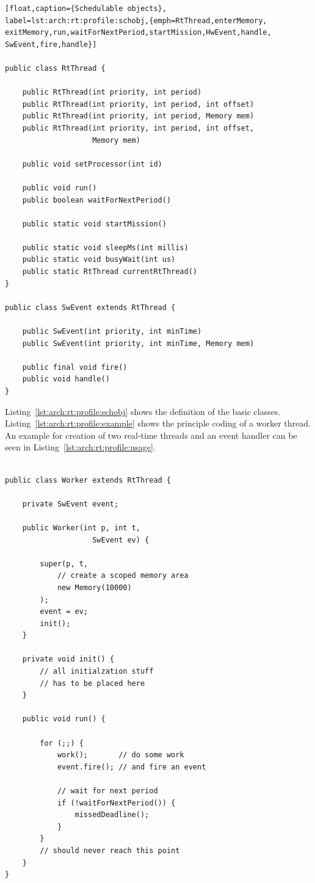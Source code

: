 \begin{lstlisting}[float,caption={Schedulable objects},
label=lst:arch:rt:profile:schobj,{emph=RtThread,enterMemory,
exitMemory,run,waitForNextPeriod,startMission,HwEvent,handle,
SwEvent,fire,handle}]

public class RtThread {

    public RtThread(int priority, int period)
    public RtThread(int priority, int period, int offset)
    public RtThread(int priority, int period, Memory mem)
    public RtThread(int priority, int period, int offset,
                    Memory mem)

    public void setProcessor(int id)

    public void run()
    public boolean waitForNextPeriod()

    public static void startMission()

    public static void sleepMs(int millis)
    public static void busyWait(int us)
    public static RtThread currentRtThread()
}

public class SwEvent extends RtThread {

    public SwEvent(int priority, int minTime)
    public SwEvent(int priority, int minTime, Memory mem)

    public final void fire()
    public void handle()
}
\end{lstlisting}

Listing~\ref{lst:arch:rt:profile:schobj} shows the definition of the
basic classes. Listing~\ref{lst:arch:rt:profile:example} shows the
principle coding of a worker thread. An example for creation of two
real-time threads and an event handler can be seen in
Listing~\ref{lst:arch:rt:profile:usage}.

\begin{lstlisting}[float,caption={A periodic real-time thread},
label=lst:arch:rt:profile:example]

public class Worker extends RtThread {

    private SwEvent event;

    public Worker(int p, int t,
                    SwEvent ev) {

        super(p, t,
            // create a scoped memory area
            new Memory(10000)
        );
        event = ev;
        init();
    }

    private void init() {
        // all initialzation stuff
        // has to be placed here
    }

    public void run() {

        for (;;) {
            work();       // do some work
            event.fire(); // and fire an event

            // wait for next period
            if (!waitForNextPeriod()) {
                missedDeadline();
            }
        }
        // should never reach this point
    }
}
\end{lstlisting}

